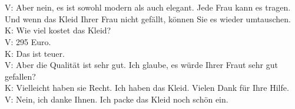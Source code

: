 \\
\\
\noindent
V: Aber nein, es ist sowohl modern als auch elegant.  Jede Frau kann es tragen. Und wenn das Kleid Ihrer Frau nicht gefällt, können Sie es wieder umtauschen.  \\
K: Wie viel kostet das Kleid? \\
V: 295 Euro. \\
K: Das ist teuer. \\
V: Aber die Qualität ist sehr gut. Ich glaube, es würde Ihrer Fraut sehr gut gefallen? \\
K: Vielleicht haben sie Recht.  Ich haben das Kleid. Vielen Dank für Ihre Hilfe. \\
V: Nein, ich danke Ihnen. Ich packe das Kleid noch schön ein. \\

